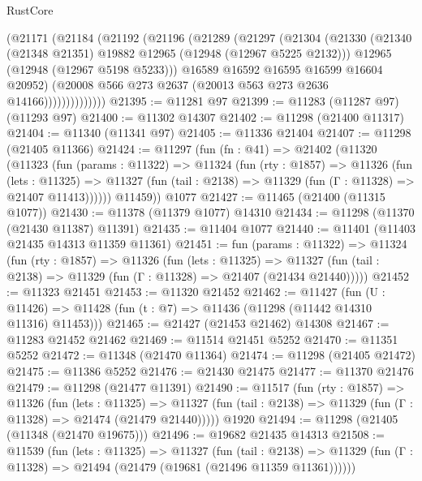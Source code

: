 \begin{lexlean}{RustCore}
\begin{coremodule}
                (@21171
                  (@21184
                    (@21192
                      (@21196
                        (@21289
                          (@21297
                            (@21304
                              (@21330
                                (@21340 (@21348 @21351) @19882 @12965 (@12948 (@12967 @5225 @2132)))
                                @12965
                                (@12948 (@12967 @5198 @5233)))
                              @16589
                              @16592
                              @16595
                              @16599
                              @16604
                              @20952)
                            (@20008 @566 @273 @2637 (@20013 @563 @273 @2636 @14166))))))))))))))
@21395 := @11281 @97
@21399 := @11283 (@11287 @97) (@11293 @97)
@21400 := @11302 @14307
@21402 := @11298 (@21400 @11317)
@21404 := @11340 (@11341 @97)
@21405 := @11336 @21404
@21407 := @11298 (@21405 @11366)
@21424 := @11297
    (fun (fn : @41) =>
    @21402
      (@11320
        (@11323
          (fun (params : @11322) =>
          @11324
            (fun (rty : @1857) =>
            @11326
              (fun (lets : @11325) =>
              @11327 (fun (tail : @2138) => @11329 (fun (Γ : @11328) => @21407 @11413))))))
        @11459))
    @1077
@21427 := @11465 (@21400 (@11315 @1077))
@21430 := @11378 (@11379 @1077) @14310
@21434 := @11298 (@11370 (@21430 @11387) @11391)
@21435 := @11404 @1077
@21440 := @11401 (@11403 @21435 @14313 @11359 @11361)
@21451 := fun (params : @11322) =>
  @11324
    (fun (rty : @1857) =>
    @11326
      (fun (lets : @11325) =>
      @11327 (fun (tail : @2138) => @11329 (fun (Γ : @11328) => @21407 (@21434 @21440)))))
@21452 := @11323 @21451
@21453 := @11320 @21452
@21462 := @11427
    (fun (U : @11426) => @11428 (fun (t : @7) => @11436 (@11298 (@11442 @14310 @11316) @11453)))
@21465 := @21427 (@21453 @21462) @14308
@21467 := @11283 @21452 @21462
@21469 := @11514 @21451 @5252
@21470 := @11351 @5252
@21472 := @11348 (@21470 @11364)
@21474 := @11298 (@21405 @21472)
@21475 := @11386 @5252
@21476 := @21430 @21475
@21477 := @11370 @21476
@21479 := @11298 (@21477 @11391)
@21490 := @11517
    (fun (rty : @1857) =>
    @11326
      (fun (lets : @11325) =>
      @11327 (fun (tail : @2138) => @11329 (fun (Γ : @11328) => @21474 (@21479 @21440)))))
    @1920
@21494 := @11298 (@21405 (@11348 (@21470 @19675)))
@21496 := @19682 @21435 @14313
@21508 := @11539
    (fun (lets : @11325) =>
    @11327
      (fun (tail : @2138) =>
      @11329 (fun (Γ : @11328) => @21494 (@21479 (@19681 (@21496 @11359 @11361))))))

\end{coremodule}
\end{lexlean}
